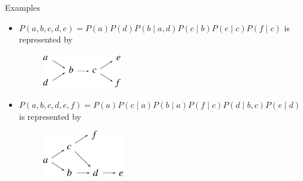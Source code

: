 \no Examples
\begin{itemize}
	\item $P(a, b, c, d, e) = P(a)P(d) P(b\;|\;a,d) P(c\;|\;b) P(e\;|\;c) P(f\;|\;c)$ is represented by 

	\begin{figure}[h!]
	\centering
		\includegraphics[height=15mm]{./figs/04-abcdef.pdf} 
	\end{figure}

	\item $P(a, b, c, d, e, f) = P(a) P(c\;|\;a) P(b\;|\;a) P(f\;|\;c) P(d\;|\;b, c) P(e\;|\;d)$ is represented by

	\begin{figure}[h!]
	\centering
		\includegraphics[height=20mm]{./figs/04-abcdef2.pdf} 
	\end{figure}
\end{itemize}

\newpage
